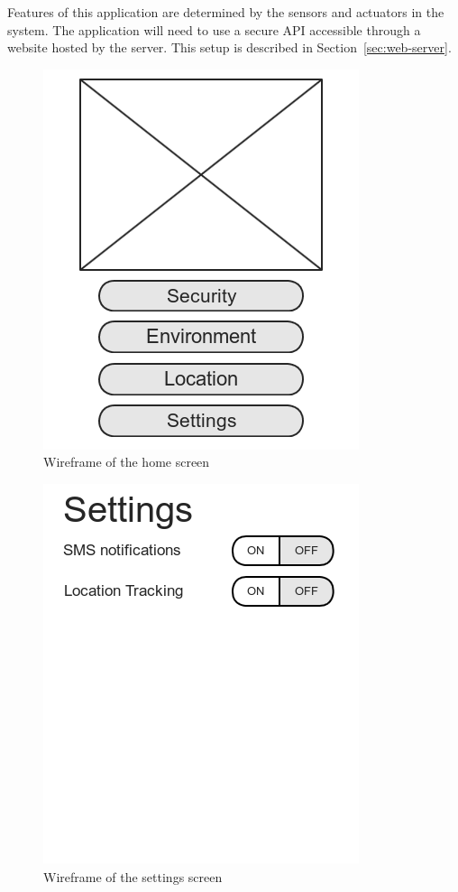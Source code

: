 \documentclass{report}
\begin{document}
Features of this application are determined by the sensors and actuators in the
system. The application will need to use a secure API accessible through a
website hosted by the server. This setup is described in
Section~\ref{sec:web-server}.

\begin{figure}[H]
    \centering
    \includegraphics[scale=0.5]{mock_home}
    \caption[Wireframe of the home screen]
            {Wireframe of the home screen}
    \label{fig:wireframe-home}
\end{figure}

\begin{figure}[H]
    \centering
    \includegraphics[scale=0.5]{mock_settings}
    \caption[Wireframe of the settings screen]
            {Wireframe of the settings screen}
    \label{fig:wireframe-settings}
\end{figure}
\end{document}
